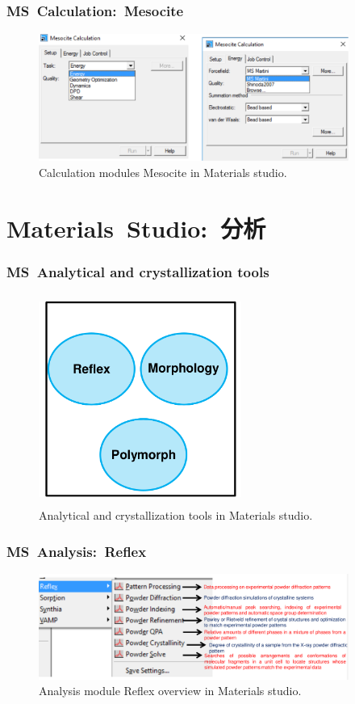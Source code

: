 \frame
{
	\frametitle{\textrm{MS~Calculation:~Mesocite}}
\begin{figure}[h!]
\centering
\includegraphics[height=1.65in,width=4.00in,viewport=0 0 1188 488,clip]{Figures/MS-Caluculator_Mesocite-parameter.png}
\caption{\tiny \textrm{Calculation modules Mesocite in Materials studio.}}%
\label{MS-Mesocite}
\end{figure}
}

\section{\rm{Materials~Studio}:~分析}
\frame
{
	\frametitle{\textrm{MS~Analytical and crystallization tools}}
\begin{figure}[h!]
\centering
\vspace*{-0.18in}
\includegraphics[height=2.70in,width=2.61in,viewport=0 0 850 821,clip]{Figures/MS-Analysis-cry_tools.png}
\caption{\tiny \textrm{Analytical and crystallization tools in Materials studio.}}%
\label{MS-Analysis-cry}
\end{figure}
}

\frame
{
	\frametitle{\textrm{MS~Analysis:~Reflex}}
\begin{figure}[h!]
\centering
\includegraphics[height=1.36in,width=4.00in,viewport=0 0 1374 467,clip]{Figures/MS-Analysis_Reflex.png}
\caption{\tiny \textrm{Analysis module Reflex overview in Materials studio.}}%
\label{MS-Analysis-Reflex-overview}
\end{figure}
}

